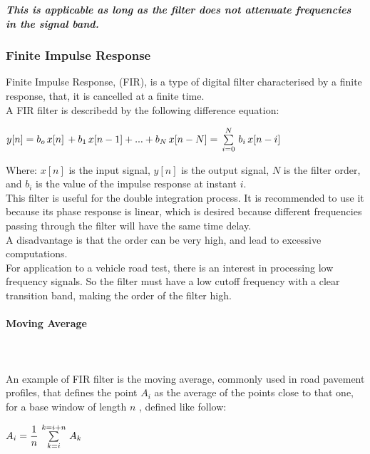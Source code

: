 \documentclass{standalone}
\begin{document}
\noindent \textit{\textbf{This is applicable as long as the filter does not attenuate frequencies in the signal band. }}

\subsubsection{Finite Impulse Response} \label{Finite Impulse Response}
Finite Impulse Response, (FIR), is a type of digital filter characterised by a finite response, that, it is cancelled at a finite time.\\
A FIR filter is describedd by the following difference equation:

\begin{center}
{\large $y[n] = b_{o} \thinspace x[n] \thinspace  + b_{1} \thinspace  x[n-1] + ... + b_{N} \thinspace  x[n - N] = \thinspace  \sum\limits_{i=0}^{N} \thinspace  b_{i} \thinspace  x[n-i]$}

\end{center}

\noindent Where: 
$x[n]$ is the input signal, $y[n]$ is the output signal, $N$ is the filter order, and $b_{i}$ is the value of the impulse response at instant $i$.\\
This filter is useful for the double integration process. It is recommended to use it because its phase response is linear, which is desired because different frequencies passing through the filter will have the same time delay.\\
A disadvantage is that the order can be very high, and lead to excessive computations.\\
For application to a vehicle road test, there is an interest in processing low frequency signals. So the filter must have a low cutoff frequency with a clear transition band, making the order of the filter high. \\

\clearpage
\paragraph{Moving Average} \leavevmode\\\\
An example of FIR filter is the moving average, commonly used in road pavement profiles, that defines the point $A_{i}$ as the average of the points close to that one, for a base window of length $n$ \cite{little_book}, defined like follow:
\begin{center}
{\large $ A_{i} = \dfrac{1}{n} \thinspace  \sum\limits_{k=i}^{k=i+n} \thinspace  A_{k}$}
\end{center}
\end{document}
